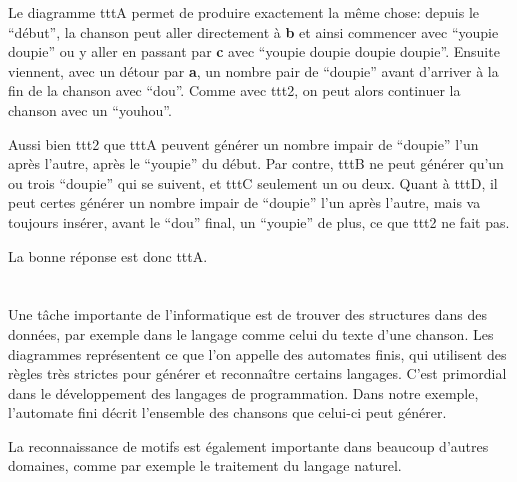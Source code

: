 {{{\centering%
\par}

Le diagramme tttA permet de produire exactement la même chose: depuis le “début”, la chanson peut aller directement à \textbf{b} et ainsi commencer avec “youpie doupie” ou y aller en passant par \textbf{c} avec “youpie doupie doupie doupie”. Ensuite viennent, avec un détour par \textbf{a}, un nombre pair de “doupie” avant d’arriver à la fin de la chanson avec “dou”. Comme avec ttt2, on peut alors continuer la chanson avec un “youhou”.

{\centering%
\par}

Aussi bien ttt2 que tttA peuvent générer un nombre impair de “doupie” l’un après l’autre, après le “youpie” du début. Par contre, tttB ne peut générer qu’un ou trois “doupie” qui se suivent, et tttC seulement un ou deux. Quant à tttD, il peut certes générer un nombre impair de “doupie” l’un après l’autre, mais va toujours insérer, avant le “dou” final, un “youpie” de plus, ce que ttt2 ne fait pas.

La bonne réponse est donc tttA.



\section*{\BrochureItsInformatics}
Une tâche importante de l’informatique est de trouver des structures dans des données, par exemple dans le langage comme celui du texte d’une chanson. Les diagrammes représentent ce que l’on appelle des automates finis, qui utilisent des règles très strictes pour générer et reconnaître certains langages. C’est primordial dans le développement des langages de programmation. Dans notre exemple, l’automate fini décrit l’ensemble des chansons que celui-ci peut générer.

La reconnaissance de motifs est également importante dans beaucoup d’autres domaines, comme par exemple le traitement du langage naturel.



}}

